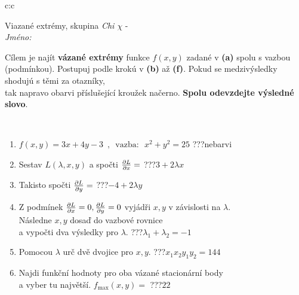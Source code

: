 \documentclass[10pt]{report}
\begin{document}
\begin{tabular}{c:c}
\begin{minipage}[c][104.5mm][t]{0.5\linewidth}
\begin{center}
\vspace{7mm}
{\huge Viazané extrémy, skupina \textit{Chi $\chi$} -}\\[5mm]
\textit{Jméno:}\phantom{xxxxxxxxxxxxxxxxxxxxxxxxxxxxxxxxxxxxxxxxxxxxxxxxxxxxxxxxxxxxxxxxx}\\[5mm]
\begin{minipage}{0.95\linewidth}
\begin{center}
Cílem je najít \textbf{vázané extrémy} funkce $f(x,y)$ zadané v \textbf{(a)} spolu s vazbou (podmínkou). Postupuj podle krokú v \textbf{(b)} až \textbf{(f)}. Pokud se medzivýsledky shodujú s těmi za otazníky,\\tak napravo obarvi příslušející kroužek načerno. \textbf{Spolu odevzdejte výsledné slovo}.
\end{center}
\end{minipage}
\\[1mm]
\begin{minipage}{0.79\linewidth}
\begin{center}
\begin{varwidth}{\linewidth}
\begin{enumerate}
\normalsize
\item $f(x,y)=3x+4y-3 \enspace , \enspace \mathrm{vazba:} \enspace x^2+y^2=25$\quad \dotfill\; ???\;\dotfill \quad nebarvi
\item Sestav $L(\lambda,x,y)$ a spočti $\pdv{L}{x}=$\quad \dotfill\; ???\;\dotfill \quad $3+2\lambda x$
\item Takisto spočti $\pdv{L}{y}=$\quad \dotfill\; ???\;\dotfill \quad $-4+2\lambda y$
\item Z podmínek $\pdv{L}{x}=0 , \pdv{L}{y}=0$ vyjádři $x,y$ v závislosti na $\lambda$.\\ \phantom{xxxxxx}Následne $x,y$ dosaď do vazbové rovnice\\ \phantom{xxxxxx}a vypočti dva výsledky pro $\lambda$.\quad \dotfill\; ???\;\dotfill \quad $\lambda_1+\lambda_2=-1$
\item Pomocou $\lambda$ urč dvě dvojice pro $x,y$.\quad \dotfill\; ???\;\dotfill \quad $x_1 x_2 y_1 y_2=144$
\item Najdi funkční hodnoty pro oba vázané stacionární body\\ \phantom{xxxxxx}a vyber tu najvětší. $f_{\text{max}}(x,y)=$\quad \dotfill\; ???\;\dotfill \quad $22$

\end{enumerate}
\end{varwidth}
\end{center}
\end{minipage}
\end{center}
\end{minipage}
\end{tabular}
\end{document}
